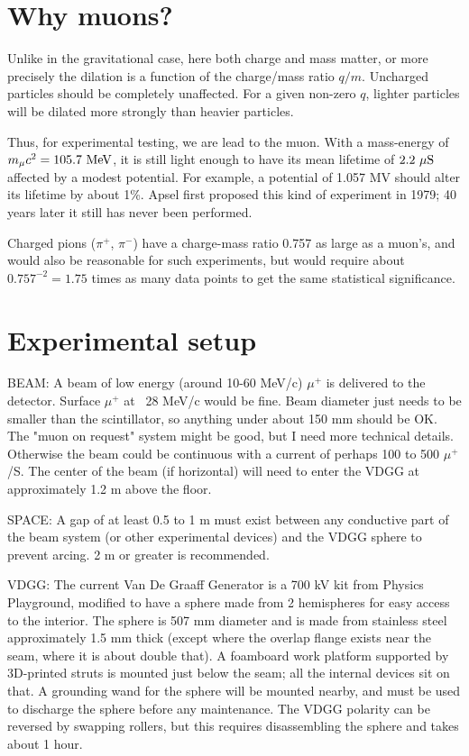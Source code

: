 \documentclass[12pt]{amsart}
\theoremstyle{plain}
\theoremstyle{definition}
\theoremstyle{remark}
\begin{document}
\section{Why muons?}

Unlike in the gravitational case,
here both charge and mass matter,
or more precisely the dilation is a function of the charge/mass ratio $q/m$.
Uncharged particles should be completely unaffected.
For a given non-zero $q$, lighter particles will be dilated more strongly than heavier particles.

Thus, for experimental testing, we are lead to the muon.
With a mass-energy of $m_\mu c^2 = 105.7\ \textup{MeV}$,
it is still light enough to have its mean lifetime of $2.2\ \mu \textup{S}$
affected by a modest potential.
For example, a potential of 1.057 MV should alter its lifetime by about 1\%.
Apsel first proposed this kind of experiment in 1979\cite{Apsel1979};
40 years later it still has never been performed.

Charged pions ($\pi^+$, $\pi^-$) have a charge-mass ratio 0.757 as large as a muon's,
and would also be reasonable for such experiments, but would require about
$0.757^{-2} = 1.75$ times as many data points to get the same statistical significance.

\section{Experimental setup}

BEAM: A beam of low energy (around 10-60 MeV/c) $\mu^+$
is delivered to the detector.
Surface $\mu^+$ at ~28 MeV/c would be fine.
Beam diameter just needs to be smaller than the scintillator,
so anything under about 150 mm should be OK.
The "muon on request" system might be good, but I need more technical details.
Otherwise the beam could be continuous with a current of perhaps 100 to 500 $\mu^+$/S.
The center of the beam (if horizontal) will need to enter the VDGG at approximately 1.2 m above the floor.

SPACE: A gap of at least 0.5 to 1 m must exist between any conductive part of the beam system (or other experimental devices) and the VDGG sphere to prevent arcing. 2 m or greater is recommended.

VDGG: The current Van De Graaff Generator is a 700 kV kit\cite{PP700kV} from Physics Playground, modified to have a sphere made from 2 hemispheres for easy access to the interior.
The sphere is 507 mm diameter and is made from stainless steel approximately 1.5 mm thick (except where the overlap flange exists near the seam, where it is about double that).
A foamboard work platform supported by 3D-printed struts is mounted just below the seam;
all the internal devices sit on that.
A grounding wand for the sphere will be mounted nearby,
and must be used to discharge the sphere before any maintenance.
The VDGG polarity can be reversed by swapping rollers,
but this requires disassembling the sphere and takes about 1 hour.
\end{document}
